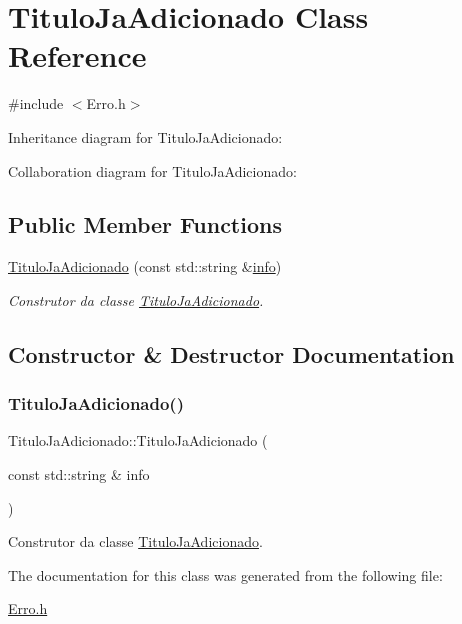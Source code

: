 \hypertarget{class_titulo_ja_adicionado}{}\section{Titulo\+Ja\+Adicionado Class Reference}
\label{class_titulo_ja_adicionado}


{\ttfamily \#include $<$Erro.\+h$>$}



Inheritance diagram for Titulo\+Ja\+Adicionado\+:


Collaboration diagram for Titulo\+Ja\+Adicionado\+:
\subsection*{Public Member Functions}
\begin{DoxyCompactItemize}
\item 
\mbox{\hyperlink{class_titulo_ja_adicionado_af041846009d91525ed739142e61ca035}{Titulo\+Ja\+Adicionado}} (const std\+::string \&\mbox{\hyperlink{class_erro_a3ecaaf6f8e15a0830a648035b456cb62}{info}})
\begin{DoxyCompactList}\small\item\em Construtor da classe \mbox{\hyperlink{class_titulo_ja_adicionado}{Titulo\+Ja\+Adicionado}}. \end{DoxyCompactList}\end{DoxyCompactItemize}


\subsection{Constructor \& Destructor Documentation}
\mbox{\label{class_titulo_ja_adicionado_af041846009d91525ed739142e61ca035}} 
\subsubsection{\texorpdfstring{Titulo\+Ja\+Adicionado()}{TituloJaAdicionado()}}
{\footnotesize\ttfamily Titulo\+Ja\+Adicionado\+::\+Titulo\+Ja\+Adicionado (\begin{DoxyParamCaption}\item[{const std\+::string \&}]{info }\end{DoxyParamCaption})\hspace{0.3cm}{\ttfamily [inline]}}



Construtor da classe \mbox{\hyperlink{class_titulo_ja_adicionado}{Titulo\+Ja\+Adicionado}}. 



The documentation for this class was generated from the following file\+:\begin{DoxyCompactItemize}
\item 
\mbox{\hyperlink{_erro_8h}{Erro.\+h}}\end{DoxyCompactItemize}
